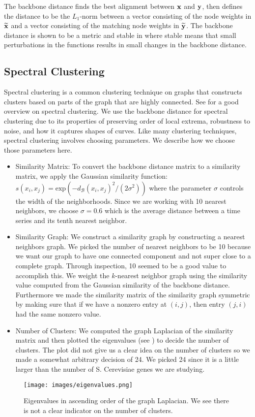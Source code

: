 The backbone distance finds the best alignment between $\textbf{x}$ and $\textbf{y}$, then
defines the distance to be the $L_1$-norm between a vector consisting of the
node weights in $\widetilde{\textbf{x}}$ and a vector consisting of the matching node weights
in $\widetilde{\textbf{y}}$. The backbone distance is shown to be a metric and stable in \cite{BeltonExtremal22} 
where stable means that small perturbations in the functions results in small changes in the backbone distance. 

\subsection{Spectral Clustering}
Spectral clustering is a common clustering technique on graphs that constructs clusters based on parts of the graph that are highly connected. 
See \cite{LuxburgA07} for a good overview on spectral clustering. We use the backbone distance for spectral clustering due to its properties of preserving order of local extrema, robustness to noise, and how it captures shapes of curves. Like many clustering techniques, spectral clustering involves choosing parameters. We describe how we choose those parameters here. 

\begin{itemize}
\item Similarity Matrix: To convert the backbone distance matrix to a similarity matrix, we apply the Gaussian similarity function: $s(x_i, x_j) = \text{exp}(-d_\mathcal{B}(x_i, x_j)^2/(2\sigma^2))$ where the parameter $\sigma$ controls the width of the neighborhoods. Since we are working with 10 nearest neighbors, we choose $\sigma = 0.6$ which is the average distance between a time series and its tenth nearest neighbor. 

\item Similarity Graph: We construct a similarity graph by constructing a nearest neighbors graph. We picked the number of nearest neighbors to be 10 because we want our graph to have one connected component and not super close to a complete graph. Through inspection, 10 seemed to be a good value to accomplish this. We weight the $k$-nearest neighbor graph using the similarity value computed from the Gaussian similarity of the backbone distance. Furthermore we made the similarity matrix of the similarity graph symmetric by making sure that if we have a nonzero entry at $(i,j)$, then entry $(j,i)$ had the same nonzero value.

\item Number of Clusters: We computed the graph Laplacian of the similarity matrix and then plotted the eigenvalues (see ) to decide the number of clusters. The plot did not give us a clear idea on the number of clusters so we made a somewhat arbitrary decision of 24. We picked 24 since it is a little larger than the number of S. Cerevisiae genes we are studying. 
\end{itemize}

\begin{figure}[htp]
    \centering
    {\texttt{[image: images/eigenvalues.png]}} \\
    \caption{Eigenvalues in ascending order of the graph Laplacian. We see there is not a clear indicator on the number of clusters.}
    \label{fig:eigenvalues}
\end{figure}

